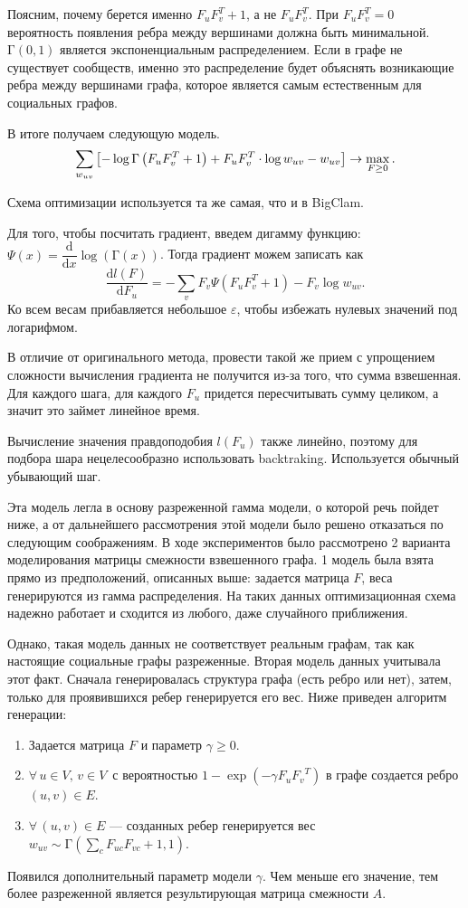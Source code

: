 \documentclass{ITaSconf}
\begin{document}
	Поясним, почему берется именно $F_u F_v^T + 1$, а не $F_u F_v^T$.
	При $F_u F_v^T=0$ вероятность появления ребра между вершинами должна быть минимальной. 
	$\mathrm{\Gamma}(0, 1)$ является экспоненциальным распределением. 
	Если в графе не существует сообществ, именно это распределение будет объяснять возникающие ребра между вершинами графа, которое является самым естественным для социальных графов.
	
	В итоге получаем следующую модель.
	$$
	\sum_{w_{uv}}\left[-\log\mathrm{\Gamma}\left( F_u F_v^T + 1 \right) + F_u F_v^T \cdot\log w_{uv} - w_{uv}\right] \rightarrow \max_{F\ge 0}. \\
	$$
	
	Схема оптимизации используется та же самая, что и в BigClam.
	
	Для того, чтобы посчитать градиент, введем дигамму функцию: $\Psi(x) = \dfrac{\mathrm{d}}{\mathrm{d}x} \log\left(\mathrm\Gamma(x)\right)$.
	Тогда градиент можем записать как
	$$\dfrac{\mathrm{d}l(F)}{\mathrm{d}F_u} = - \sum_v F_v \Psi\left(F_u F_v^T + 1\right) - F_v \log w_{uv}.$$
	Ко всем весам прибавляется небольшое $\varepsilon$, чтобы избежать нулевых значений под логарифмом.
	
	В отличие от оригинального метода, провести такой же прием с упрощением сложности вычисления градиента не получится из-за того, что сумма взвешенная. 
	Для каждого шага, для каждого $F_u$ придется пересчитывать сумму целиком, а значит это займет линейное время.
	
	Вычисление значения правдоподобия $l(F_u)$ также линейно, поэтому для подбора шара нецелесообразно использовать backtraking. 
	Используется обычный убывающий шаг.
	
	Эта модель легла в основу разреженной гамма модели, о которой речь пойдет ниже, а от дальнейшего рассмотрения этой модели было решено отказаться по следующим соображениям.
	В ходе экспериментов было рассмотрено 2 варианта моделирования матрицы смежности взвешенного графа.
	1 модель была взята прямо из предположений, описанных выше: задается матрица $F$, веса генерируются из гамма распределения.
	На таких данных оптимизационная схема надежно работает и сходится из любого, даже случайного приближения.
	
	Однако, такая модель данных не соответствует реальным графам, так как настоящие социальные графы разреженные. 
	Вторая модель данных учитывала этот факт. 
	Сначала генерировалась структура графа (есть ребро или нет), затем, только для проявившихся ребер генерируется его вес. 
	Ниже приведен алгоритм генерации:
	\begin{enumerate}
		\item Задается матрица $F$ и параметр $\gamma \ge 0 $.
		\item $\forall\, u \in V, \, v \in V \,$ с вероятностью $1 - \exp(-\gamma F_u {F_v}^T)$ в графе создается ребро $(u, v) \in E$.
		\item $\forall\, (u, v) \in E$ --- созданных ребер генерируется вес $w_{uv} \sim \mathrm{\Gamma}\left(\sum_c F_{uc} F_{vc} + 1, 1\right)$.
	\end{enumerate}
	Появился дополнительный параметр модели $\gamma$. 
	Чем меньше его значение, тем более разреженной является результирующая матрица смежности $A$.
	
\end{document}
